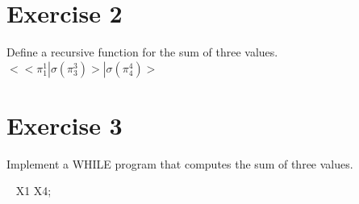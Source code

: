 \documentclass[11pt]{article}
\begin{document}
\newpage

\section{Exercise 2}

Define a recursive function for the sum of three values.
\\

$<<\pi _1^1|\sigma(\pi_3^3)>|\sigma(\pi_4^4)>$


\section{Exercise 3}
Implement a WHILE program that computes the sum of three values.

\begin{whilecode}[H]

 X1 \Assig X4;

\end{whilecode}
\end{document}
